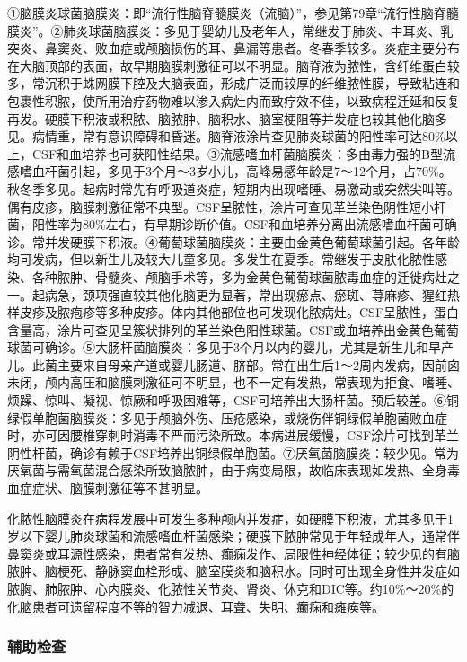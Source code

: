 ①脑膜炎球菌脑膜炎：即“流行性脑脊髓膜炎（流脑）”，参见第79章“流行性脑脊髓膜炎”。②肺炎球菌脑膜炎：多见于婴幼儿及老年人，常继发于肺炎、中耳炎、乳突炎、鼻窦炎、败血症或颅脑损伤的耳、鼻漏等患者。冬春季较多。炎症主要分布在大脑顶部的表面，故早期脑膜刺激征可以不明显。脑脊液为脓性，含纤维蛋白较多，常沉积于蛛网膜下腔及大脑表面，形成广泛而较厚的纤维脓性膜，导致粘连和包裹性积脓，使所用治疗药物难以渗入病灶内而致疗效不佳，以致病程迁延和反复再发。硬膜下积液或积脓、脑脓肿、脑积水、脑室梗阻等并发症也较其他化脑多见。病情重，常有意识障碍和昏迷。脑脊液涂片查见肺炎球菌的阳性率可达80\%以上，CSF和血培养也可获阳性结果。③流感嗜血杆菌脑膜炎：多由毒力强的B型流感嗜血杆菌引起，多见于3个月～3岁小儿，高峰易感年龄是7～12个月，占70\%。秋冬季多见。起病时常先有呼吸道炎症，短期内出现嗜睡、易激动或突然尖叫等。偶有皮疹，脑膜刺激征常不典型。CSF呈脓性，涂片可查见革兰染色阴性短小杆菌，阳性率为80\%左右，有早期诊断价值。CSF和血培养分离出流感嗜血杆菌可确诊。常并发硬膜下积液。④葡萄球菌脑膜炎：主要由金黄色葡萄球菌引起。各年龄均可发病，但以新生儿及较大儿童多见。多发生在夏季。常继发于皮肤化脓性感染、各种脓肿、骨髓炎、颅脑手术等，多为金黄色葡萄球菌脓毒血症的迁徙病灶之一。起病急，颈项强直较其他化脑更为显著，常出现瘀点、瘀斑、荨麻疹、猩红热样皮疹及脓疱疹等多种皮疹。体内其他部位也可发现化脓病灶。CSF呈脓性，蛋白含量高，涂片可查见呈簇状排列的革兰染色阳性球菌。CSF或血培养出金黄色葡萄球菌可确诊。⑤大肠杆菌脑膜炎：多见于3个月以内的婴儿，尤其是新生儿和早产儿。此菌主要来自母亲产道或婴儿肠道、脐部。常在出生后1～2周内发病，因前囟未闭，颅内高压和脑膜刺激征可不明显，也不一定有发热，常表现为拒食、嗜睡、烦躁、惊叫、凝视、惊厥和呼吸困难等，CSF可培养出大肠杆菌。预后较差。⑥铜绿假单胞菌脑膜炎：多见于颅脑外伤、压疮感染，或烧伤伴铜绿假单胞菌败血症时，亦可因腰椎穿刺时消毒不严而污染所致。本病进展缓慢，CSF涂片可找到革兰阴性杆菌，确诊有赖于CSF培养出铜绿假单胞菌。⑦厌氧菌脑膜炎：较少见。常为厌氧菌与需氧菌混合感染所致脑脓肿，由于病变局限，故临床表现如发热、全身毒血症症状、脑膜刺激征等不甚明显。

化脓性脑膜炎在病程发展中可发生多种颅内并发症，如硬膜下积液，尤其多见于1岁以下婴儿肺炎球菌和流感嗜血杆菌感染；硬膜下脓肿常见于年轻成年人，通常伴鼻窦炎或耳源性感染，患者常有发热、癫痫发作、局限性神经体征；较少见的有脑脓肿、脑梗死、静脉窦血栓形成、脑室膜炎和脑积水。同时可出现全身性并发症如脓胸、肺脓肿、心内膜炎、化脓性关节炎、肾炎、休克和DIC等。约10\%～20\%的化脑患者可遗留程度不等的智力减退、耳聋、失明、癫痫和瘫痪等。

\subsubsection{辅助检查}

